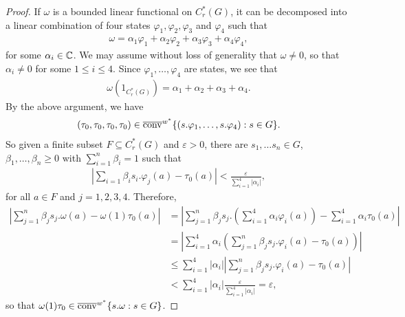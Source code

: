 \begin{theorem}
\begin{proof}
\noindent If $\omega$ is a bounded linear functional on $C_r^*(G)$, it can be decomposed into a linear combination of four states $\varphi_1, \varphi_2, \varphi_3$ and $\varphi_4$ such that
\begin{align*}
\omega= \alpha_1 \varphi_1 + \alpha_2 \varphi_2 + \alpha_3 \varphi_3 + \alpha_4 \varphi_4,
\end{align*}
for some $\alpha_i \in \mathbb{C}$. We may assume without loss of generality that $\omega \neq 0$, so that $\alpha_i \neq 0$ for some $1 \leq i \leq 4$. Since $\varphi_1, \dots , \varphi_4$ are states, we see that 
\begin{align*}
\omega(1_{C_r^*(G)})= \alpha_1 + \alpha_2 + \alpha_3 + \alpha_4.
\end{align*}
By the above argument, we have
\begin{align*}
(\tau_0,\tau_0,\tau_0,\tau_0) \in \overline{\operatorname{conv}}^{w^*}\{ (s.\varphi_1,\dots,s.\varphi_4) : s \in G \}.
\end{align*}
So given a finite subset $F \subseteq C_r^*(G)$ and $\varepsilon>0$, there are $s_1,\dots s_n \in G$, $\beta_1,\dots,\beta_n \geq 0$ with $\sum_{i=1}^n \beta_i=1$ such that
\begin{align*}
\left| \sum_{i=1} \beta_i s_i. \varphi_j(a) - \tau_0(a) \right| < \frac{\varepsilon}{\sum_{i=1}^4|\alpha_i|},
\end{align*}
for all $a \in F$ and $j=1,2,3,4$. Therefore,
\begin{align*}
\left| \sum_{j=1}^n \beta_j s_j. \omega(a)-\omega(1) \tau_0(a)\right|& = \left| \sum_{j=1}^n \beta_j s_j. \left( \sum_{i=1}^4 \alpha_i \varphi_i(a) \right) - \sum_{i=1}^4 \alpha_i \tau_0(a) \right|\\
 &= \left| \sum_{i=1}^4 \alpha_i \left( \sum_{j=1}^n \beta_j s_j .\varphi_i(a) - \tau_0(a)\right) \right|\\
&\leq \sum_{i=1}^4 |\alpha_i| \left| \sum_{j=1}^n \beta_j s_j.\varphi_i(a)-\tau_0(a)\right| \\
&< \sum_{i=1}^4 |\alpha_i|\frac{\varepsilon}{\sum_{i=1}^4|\alpha_i|}=\varepsilon,
\end{align*}
so that $\omega(1)\tau_0 \in \overline{\operatorname{conv}}^{w^*}\{s.\omega : s \in G \}$.


\end{proof}
\end{theorem}
